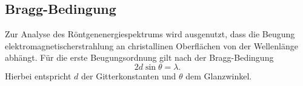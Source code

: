 \subsection{Bragg-Bedingung}
Zur Analyse des Röntgenenergiespektrums wird ausgenutzt, dass die Beugung elektromagnetischerstrahlung an christallinen
Oberflächen von der Wellenlänge abhängt. Für die erste Beugungsordnung gilt nach der Bragg-Bedingung
\begin{equation}
  2 d \sin\theta = \lambda.
\end{equation}
Hierbei entspricht $d$ der Gitterkonstanten und $\theta$ dem Glanzwinkel.
